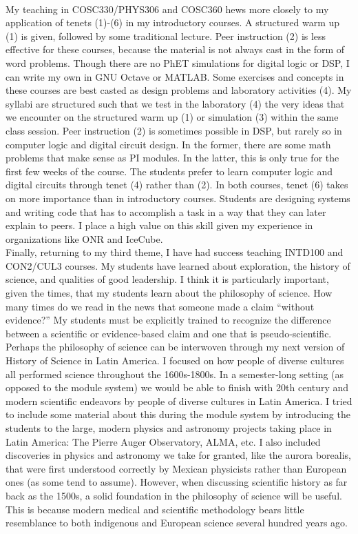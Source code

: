 \documentclass[../../../main.tex]{subfiles}
\begin{document}
\\
\vspace{0.15cm}
My teaching in COSC330/PHYS306 and COSC360 hews more closely to my application of tenets (1)-(6) in my introductory courses.  A structured warm up (1) is given, followed by some traditional lecture.  Peer instruction (2) is less effective for these courses, because the material is not always cast in the form of word problems.  Though there are no PhET simulations for digital logic or DSP, I can write my own in GNU Octave or MATLAB.  Some exercises and concepts in these courses are best casted as design problems and laboratory activities (4).  My syllabi are structured such that we test in the laboratory (4) the very ideas that we encounter on the structured warm up (1) or simulation (3) within the same class session.  Peer instruction (2) is sometimes possible in DSP, but rarely so in computer logic and digital circuit design.  In the former, there are some math problems that make sense as PI modules.  In the latter, this is only true for the first few weeks of the course.  The students prefer to learn computer logic and digital circuits through tenet (4) rather than (2).  In both courses, tenet (6) takes on more importance than in introductory courses.  Students are designing systems and writing code that has to accomplish a task in a way that they can later explain to peers.  I place a high value on this skill given my experience in organizations like ONR and IceCube.
\\
\vspace{0.15cm}
Finally, returning to my third theme, I have had success teaching INTD100 and CON2/CUL3 courses.  My students have learned about exploration, the history of science, and qualities of good leadership.  I think it is particularly important, given the times, that my students learn about the philosophy of science.  How many times do we read in the news that someone made a claim ``without evidence?''  My students must be explicitly trained to recognize the difference between a scientific or evidence-based claim and one that is pseudo-scientific.  Perhaps the philosophy of science can be interwoven through my next version of History of Science in Latin America.  I focused on how people of diverse cultures all performed science throughout the 1600s-1800s.  In a semester-long setting (as opposed to the module system) we would be able to finish with 20th century and modern scientific endeavors by people of diverse cultures in Latin America.  I tried to include some material about this during the module system by introducing the students to the large, modern physics and astronomy projects taking place in Latin America: The Pierre Auger Observatory, ALMA, etc.  I also included discoveries in physics and astronomy we take for granted, like the aurora borealis, that were first understood correctly by Mexican physicists rather than European ones (as some tend to assume).  However, when discussing scientific history as far back as the 1500s, a solid foundation in the philosophy of science will be useful.  This is because modern medical and scientific methodology bears little resemblance to both indigenous and European science several hundred years ago.
\end{document}
